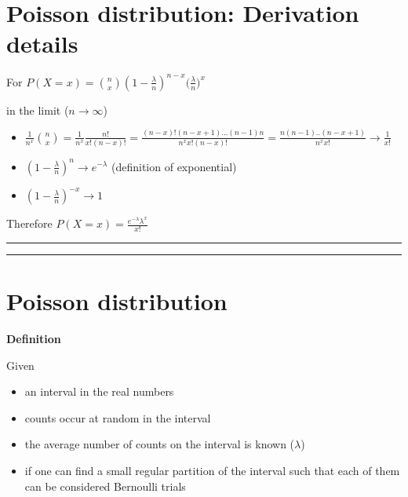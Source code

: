 \documentclass[
]{book}
\providecommand{\tightlist}{%
  \setlength{\itemsep}{0pt}\setlength{\parskip}{0pt}}
\begin{document}
\hypertarget{poisson-distribution-derivation-details}{%
\section{Poisson distribution: Derivation details}\label{poisson-distribution-derivation-details}}

For \(P(X=x)=\binom n x (1-\frac{\lambda}{n})^{n-x} \big(\frac{\lambda}{n}\big)^x\)

in the limit (\(n \rightarrow \infty\))

\begin{itemize}
\tightlist
\item
  \(\frac{1}{n^x}\binom n x =\frac{1}{n^x}\frac{n!}{x! (n-x)!}=\frac{(n-x)!(n-x+1)...(n-1)n}{n^x x! (n-x)!}=\frac{n(n-1)..(n-x+1)}{n^x x!} \rightarrow \frac{1}{x!}\)
\item
  \((1-\frac{\lambda}{n})^{n} \rightarrow e^{-\lambda}\) (definition of exponential)
\item
  \((1-\frac{\lambda}{n})^{-x} \rightarrow 1\)
\end{itemize}

Therefore
\(P(X=x)= \frac{e^{-\lambda}\lambda^x}{x!}\)

\begin{center}\rule{0.5\linewidth}{0.5pt}\end{center}

\begin{center}\rule{0.5\linewidth}{0.5pt}\end{center}

\hypertarget{poisson-distribution-2}{%
\section{Poisson distribution}\label{poisson-distribution-2}}

\textbf{Definition}

Given

\begin{itemize}
\tightlist
\item
  an interval in the real numbers
\item
  counts occur at random in the interval
\item
  the average number of counts on the interval is known (\(\lambda\))
\item
  if one can find a small regular partition of the interval such that each of them can be considered Bernoulli trials
\end{itemize}
\end{document}
